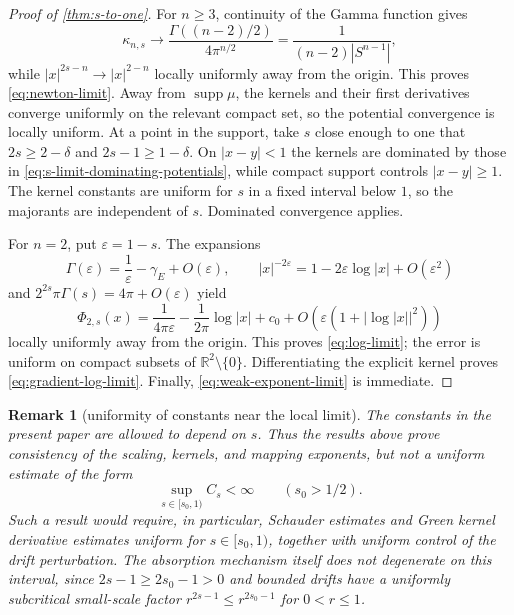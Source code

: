 \documentclass[10pt,a4paper]{amsart}
\numberwithin{equation}{section}
\newtheorem{remark}[theorem]{Remark}
\newcommand{\R}{\mathbb R}
\newcommand{\rev}[1]{#1}
\begin{document}
\begin{proof}[Proof of \cref{thm:s-to-one}]
For $n\ge3$, continuity of the Gamma function gives
\[
 \kappa_{n,s}\longrightarrow
 \frac{\Gamma((n-2)/2)}{4\pi^{n/2}}
 =\frac{1}{(n-2)|S^{n-1}|},
\]
while $|x|^{2s-n}\to|x|^{2-n}$ locally uniformly away from the origin.
This proves \eqref{eq:newton-limit}.  Away from
$\operatorname{supp}\mu$, the kernels and their first derivatives converge
uniformly on the relevant compact set, so the potential convergence is
locally uniform.  At a point in the support, take $s$ close enough to one
that $2s\ge2-\delta$ and $2s-1\ge1-\delta$.  On $|x-y|<1$ the kernels
are dominated by those in \eqref{eq:s-limit-dominating-potentials}, while
compact support controls $|x-y|\ge1$.  \rev{The kernel constants are
uniform for $s$ in a fixed interval below $1$, so the majorants are
independent of $s$.}  Dominated
convergence applies.

For $n=2$, put $\varepsilon=1-s$.  The expansions
\[
 \Gamma(\varepsilon)=\frac1\varepsilon-\gamma_E+O(\varepsilon),
 \qquad |x|^{-2\varepsilon}=1-2\varepsilon\log|x|+O(\varepsilon^2)
\]
and $2^{2s}\pi\Gamma(s)=4\pi+O(\varepsilon)$ yield
\[
 \Phi_{2,s}(x)=\frac{1}{4\pi\varepsilon}
 -\frac{1}{2\pi}\log|x|+c_0+O(\varepsilon(1+|\log|x||^2))
\]
locally uniformly away from the origin.  This proves
\eqref{eq:log-limit}; \rev{the error is uniform on compact subsets of
$\R^2\setminus\{0\}$.}
Differentiating the explicit kernel proves
\eqref{eq:gradient-log-limit}.  Finally,
\eqref{eq:weak-exponent-limit} is immediate.
\end{proof}

\begin{remark}[uniformity of constants near the local limit]
\label{rem:uniform-s}
The constants in the present paper are allowed to depend on $s$.  Thus the
results above prove consistency of the scaling, kernels, and mapping
exponents, but not a uniform estimate of the form
\[
 \sup_{s\in[s_0,1)}C_s<\infty
 \qquad(s_0>1/2).
\]
Such a result would require, in particular, Schauder estimates and Green
kernel derivative estimates uniform for $s\in[s_0,1)$, together with
uniform control of the drift perturbation.  The absorption mechanism itself
does not degenerate on this interval, since $2s-1\ge2s_0-1>0$ and bounded
drifts have a uniformly subcritical small-scale factor
$r^{2s-1}\le r^{2s_0-1}$ for $0<r\le1$.
\end{remark}
\end{document}
